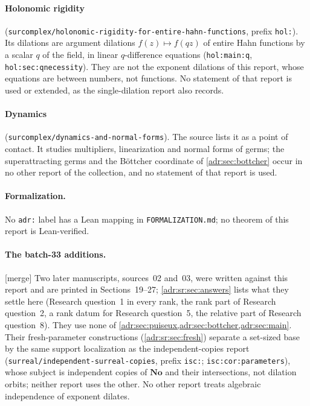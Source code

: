 \documentclass[11pt,letterpaper]{article}
\numberwithin{equation}{section}
\theoremstyle{definition}
\theoremstyle{remark}
\newcommand{\No}{\mathbf{No}}
\newcommand{\rpath}[1]{\nolinkurl{#1}}%
\newcommand{\lbl}[1]{\nolinkurl{#1}}%
\newcommand{\mtag}{\textup{[merge]}}%
\begin{document}
\paragraph{Holonomic rigidity}
(\rpath{surcomplex/holonomic-rigidity-for-entire-hahn-functions}, prefix
\texttt{hol:}). Its dilations are argument dilations $f(z)\mapsto f(qz)$ of
entire Hahn functions by a scalar $q$ of the field, in linear
$q$-difference equations (\lbl{hol:main:q}, \lbl{hol:sec:qnecessity}).
They are not the exponent dilations of this report, whose equations are
between numbers, not functions. No statement of that report is used or
extended, as the single-dilation report also records.

\paragraph{Dynamics}
(\rpath{surcomplex/dynamics-and-normal-forms}). The source lists it as a
point of contact. It studies multipliers, linearization and normal forms of
germs; the superattracting germs and the B\"ottcher coordinate of
\cref{adr:sec:bottcher} occur in no other report of the collection, and no
statement of that report is used.

\paragraph{Formalization.} No \texttt{adr:} label has a Lean mapping in
\rpath{FORMALIZATION.md}; no theorem of this report is Lean-verified.

\paragraph{The batch-33 additions.} \mtag{} Two later manuscripts, sources~02
and~03, were written against this report and are printed in
Sections~19--27; \cref{adr:sr:sec:answers} lists what they settle here
(Research question~1 in every rank, the rank part of Research question~2, a
rank datum for Research question~5, the relative part of Research
question~8). They use none of \cref{adr:sec:puiseux,adr:sec:bottcher,adr:sec:main}.
Their fresh-parameter constructions (\cref{adr:sr:sec:fresh}) separate a
set-sized base by the same support localization as the independent-copies
report (\rpath{surreal/independent-surreal-copies}, prefix \texttt{isc:};
\lbl{isc:cor:parameters}), whose subject is independent copies of $\No$ and
their intersections, not dilation orbits; neither report uses the other. No
other report treats algebraic independence of exponent dilates.
\end{document}
